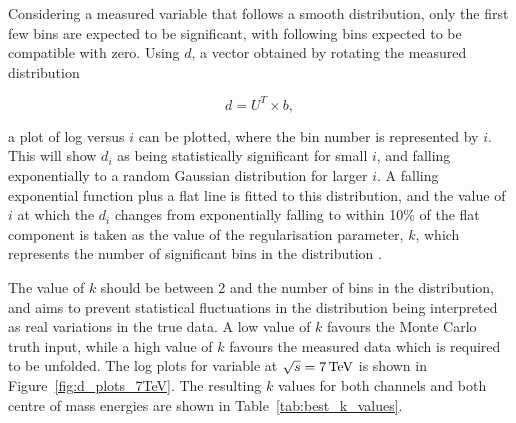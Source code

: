 Considering a measured variable that follows a smooth distribution, %
only the first few bins are expected to be significant, with following bins expected to be compatible with
zero. Using $d$, a vector obtained by rotating the measured distribution

\begin{equation}
d = U^{T}\times{b},
\label{eq:d}
\end{equation}

a plot of log versus $i$ can be plotted, where the bin number
is represented by $i$. This will show $d_{i}$ as being statistically significant for small $i$, and falling exponentially to a random Gaussian
distribution for larger $i$. A falling exponential function plus a flat line is fitted to this distribution,
and the value of $i$ at which the $d_{i}$ changes from exponentially falling to within 10\% of the flat
component is taken as the value of the regularisation parameter, $k$, which represents the number of
significant bins in the distribution \cite{Hocker:1995kb}.

The value of $k$ should be between 2 and the number of bins in the distribution, and aims to prevent
statistical fluctuations in the distribution being interpreted as real variations in the true data. A low
value of $k$ favours the Monte Carlo truth input, while a high value of $k$ favours the measured data which is
required to be unfolded. The log plots for \met variable at $\sqrt{s}=7\,\text{Te\hspace{-.08em}V}$ is shown in
Figure~\ref{fig:d_plots_7TeV}. The resulting $k$ values for both channels and both centre of mass energies are
shown in Table~\ref{tab:best_k_values}.

